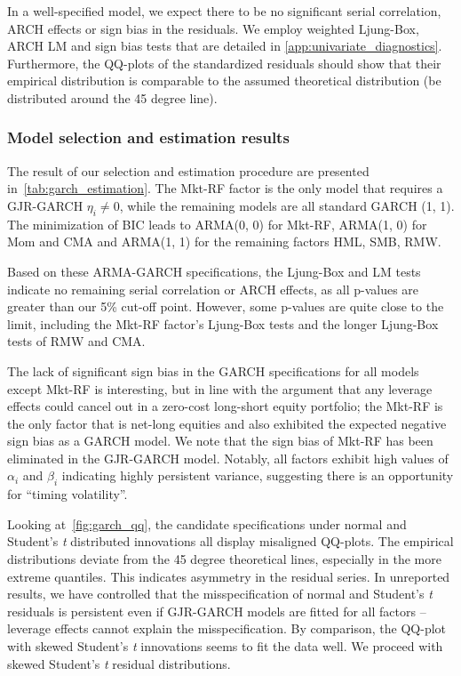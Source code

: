 In a well-specified model, we expect there to be no significant serial correlation, ARCH effects or sign bias in the residuals. We employ weighted Ljung-Box, ARCH LM and sign bias tests that are detailed in \autoref{app:univariate_diagnostics}. Furthermore, the QQ-plots of the standardized residuals should show that their empirical distribution is comparable to the assumed theoretical distribution (be distributed around the 45 degree line).

\subsubsection{Model selection and estimation results}

The result of our selection and estimation procedure are presented in~\autoref{tab:garch_estimation}. The Mkt-RF factor is the only model that requires a GJR-GARCH $\eta_i \neq 0$, while the remaining models are all standard GARCH (1, 1). The minimization of BIC leads to ARMA(0, 0) for Mkt-RF, ARMA(1, 0) for Mom and CMA and ARMA(1, 1) for the remaining factors HML, SMB, RMW. 



Based on these ARMA-GARCH specifications, the Ljung-Box and LM tests indicate no remaining serial correlation or ARCH effects, as all p-values are greater than our 5\% cut-off point. However, some p-values are quite close to the limit, including the Mkt-RF factor's Ljung-Box tests and the longer Ljung-Box tests of RMW and CMA.

The lack of significant sign bias in the GARCH specifications for all models except Mkt-RF is interesting, but in line with the argument that any leverage effects could cancel out in a zero-cost long-short equity portfolio; the Mkt-RF is the only factor that is net-long equities and also exhibited the expected negative sign bias as a GARCH model. We note that the sign bias of Mkt-RF has been eliminated in the GJR-GARCH model. Notably, all factors exhibit high values of $\alpha_i$ and $\beta_i$ indicating highly persistent variance, suggesting there is an opportunity for ``timing volatility''.


Looking at~\autoref{fig:garch_qq}, the candidate specifications under normal and Student's \textit{t} distributed innovations all display misaligned QQ-plots. The empirical distributions deviate from the 45 degree theoretical lines, especially in the more extreme quantiles. This indicates asymmetry in the residual series. In unreported results, we have controlled that the misspecification of normal and Student's \textit{t} residuals is persistent even if GJR-GARCH models are fitted for all factors -- leverage effects cannot explain the misspecification. By comparison, the QQ-plot with skewed Student's \textit{t} innovations seems to fit the data well. We proceed with skewed Student's \textit{t} residual distributions.

